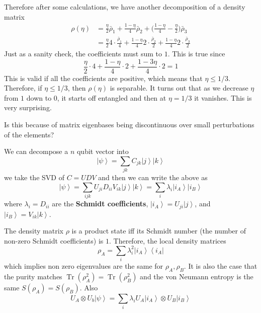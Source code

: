 \documentclass{article}
\DeclareMathOperator{\Tr}{Tr}
\newcommand{\ket}[1]{\ensuremath{\left|#1\right\rangle}}
\newcommand{\bra}[1]{\ensuremath{\left\langle#1\right|}}
\begin{document}
  Therefore after some calculations, we have another decomposition of a density matrix 
  \begin{align}
    \rho(\eta) & = \frac{\eta}{2} \bar{\rho}_1 + \frac{1 - \eta}{4} \bar{\rho}_2 + \bigg( \frac{1 - \eta}{4} - \frac{\eta}{2} \bigg) \bar{\rho}_3 \\
               & = \frac{\eta}{2} 4 \cdot \frac{\bar{\rho}_1}{4} + \frac{1 - \eta}{4} 2 \cdot \frac{\bar{\rho}_2}{2} + \frac{1 - \eta}{4} 2 \cdot \frac{\bar{\rho}_3}{2} 
  \end{align}
  Just as a sanity check, the coefficients must sum to $1$. This is true since 
  \begin{equation}
    \frac{\eta}{2} \cdot 4 + \frac{1 - \eta}{4} \cdot 2 + \frac{1 - 3\eta}{4} \cdot 2 = 1 
  \end{equation}
  This is valid if all the coefficients are positive, which means that $\eta \leq 1/3$. Therefore, if $\eta \leq 1/3$, then $\rho(\eta)$ is separable. It turns out that as we decrease $\eta$ from $1$ down to $0$, it starts off entangled and then at $\eta = 1/3$ it vanishes. This is very surprising. 

  \begin{question}
    Is this because of matrix eigenbases being discontinuous over small perturbations of the elements? 
  \end{question}

  \begin{definition}
    We can decompose a $n$ qubit vector into 
    \begin{equation}
      \ket{\psi} = \sum_{j k} C_{j k} \ket{j} \ket{k} 
    \end{equation}
    we take the SVD of $C = U D V$ and then we can write the above as 
    \begin{equation}
      \ket{\psi} = \sum_{i j k} U_{ji} D_{ii} V_{ik} \ket{j} \ket{k} = \sum_i \lambda_i \ket{i_A} \ket{i_B} 
    \end{equation}
    where $\lambda_i = D_{ii}$ are the \textbf{Schmidt coefficients}, $\ket{i_A} = U_{j i} \ket{j}$, and $\ket{i_B} = V_{ik} \ket{k}$. 
  \end{definition}

  \begin{lemma} 
    The density matrix $\rho$ is a product state iff its Schmidt number (the number of non-zero Schmidt coefficients) is $1$. Therefore, the local density matrices 
    \begin{equation}
      \rho_A = \sum_i \lambda_i^2 \ket{i_A} \bra{i_A} 
    \end{equation}
    which implies non zero eigenvalues are the same for $\rho_A, \rho_B$. It is also the case that the purity matches $\Tr(\rho_A^2) = \Tr(\rho_B^2)$ and the von Neumann entropy is the same $S(\rho_A) = S(\rho_B)$. Also 
    \begin{equation}
      U_A \otimes U_b \ket{\psi} = \sum_i \lambda_i U_A \ket{i_A} \otimes U_B \ket{i_B} 
    \end{equation}
  \end{lemma}
\end{document}
